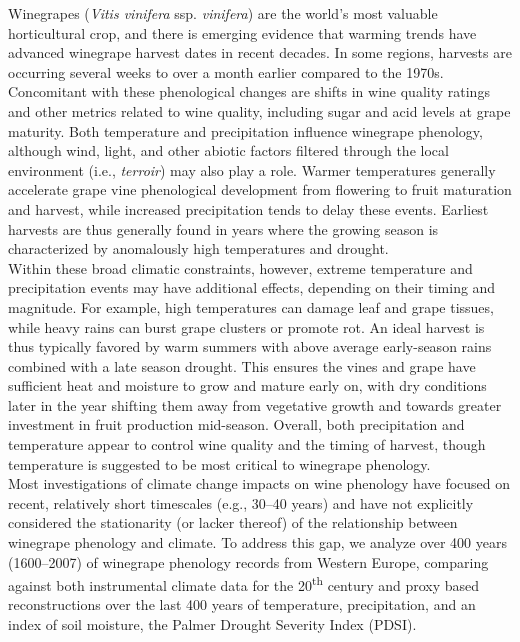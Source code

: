 \documentclass[final]{nature}
\begin{document}
\noindent Winegrapes (\emph{Vitis vinifera} ssp. \emph{vinifera}) are the world's most valuable horticultural crop, and there is emerging evidence that warming trends have advanced winegrape harvest dates in recent decades\cite{Jones:2000br,schultzjones,tomasi2011,odo2012,webb2012}. In some regions, harvests are occurring several weeks to over a month earlier compared to the 1970s\cite{Duchene:2005bd,Seguin2005,webb2011}. Concomitant with these phenological changes are shifts in wine quality ratings\cite{jones2005} and other metrics related to wine quality\cite{mori2007}, including sugar and acid levels at grape maturity\cite{Jones:2000br}. Both temperature and precipitation influence winegrape phenology, although wind, light, and other abiotic factors filtered through the local environment (i.e., \emph{terroir}) may also play a role\cite{Gladstones2011}. Warmer temperatures generally accelerate grape vine phenological development from flowering to fruit maturation and harvest, while increased precipitation tends to delay these events\cite{jones2013}. Earliest harvests are thus generally found in years where the growing season is characterized by anomalously high temperatures and drought\cite{Jones:2000br}.\\
\indent Within these broad climatic constraints, however, extreme temperature and precipitation events may have additional effects, depending on their timing and magnitude. For example, high temperatures can damage leaf and grape tissues\cite{greer2010,Gladstones2011}, while heavy rains can burst grape clusters or promote rot\cite{jones2013}. An ideal harvest is thus typically favored by warm summers with above average early-season rains combined with a late season drought. This ensures the vines and grape have sufficient heat and moisture to grow and mature early on, with dry conditions later in the year shifting them away from vegetative growth and towards greater investment in fruit production mid-season\cite{chaves2010,jones2013,baciocco2014}. Overall, both precipitation\cite{vanlee2009} and temperature\cite{baciocco2014} appear to control wine quality and the timing of harvest\cite{odo2012,webb2012}, though temperature is suggested to be most critical to winegrape phenology\cite{coombe1987,jones2005}.\\
\indent Most investigations of climate change impacts on wine phenology have focused on recent, relatively short timescales (e.g., 30--40 years\cite{Duchene:2005bd,tomasi2011,webb2012}) and have not explicitly considered the stationarity (or lacker thereof) of the relationship between winegrape phenology and climate. To address this gap, we analyze over 400 years (1600--2007) of winegrape phenology records from Western Europe\cite{Daux2012}, comparing against both instrumental climate data for the 20\textsuperscript{th} century\cite{Harris2014} and proxy based reconstructions over the last 400 years of temperature\cite{Luterbacher2004}, precipitation\cite{Pauling2006}, and an index of soil moisture, the Palmer Drought Severity Index\cite{CookOWDA2015} (PDSI).\\
\end{document}
